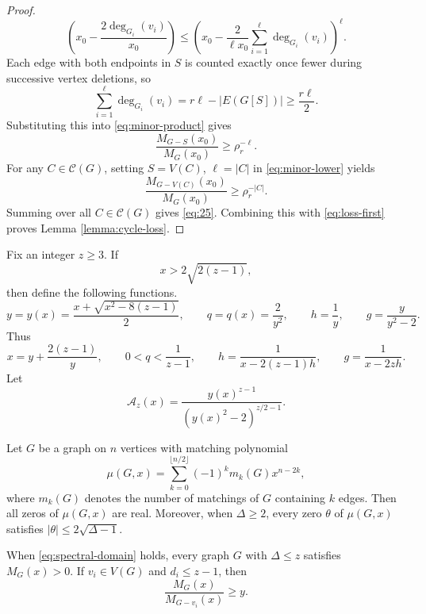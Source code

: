 \documentclass[11pt, a4paper]{article}
\begin{document}
\begin{proof}
\begin{equation}
\left(
x_0-\frac{2\deg_{G_i}(v_i)}{x_0}
\right)
\leq
\left(
x_0-\frac{2}{\ell x_0}
\sum_{i=1}^{\ell}\deg_{G_i}(v_i)
\right)^{\ell}.
\label{eq:minor-product}
\end{equation}
Each edge with both endpoints in $S$ is counted exactly once fewer during successive vertex deletions, so
\[
 \sum_{i=1}^{\ell}\deg_{G_i}(v_i)
 =r\ell-|E(G[S])|\geq\frac{r\ell}{2}.
\]
Substituting this into \eqref{eq:minor-product} gives
\begin{equation}\label{eq:minor-lower}
 \frac{M_{G-S}(x_0)}{M_G(x_0)}\geq \rho_r^{-\ell}.
\end{equation}
For any $C\in\mathcal{C}(G)$,
setting $S=V(C)$, $\ell=|C|$ in \eqref{eq:minor-lower} yields
\[
\frac{M_{G-V(C)}(x_0)}
{M_G(x_0)}
\ge
\rho_r^{-|C|}.
\]
Summing over all $C\in\mathcal{C}(G)$ gives \eqref{eq:25}.
Combining this with \eqref{eq:loss-first} proves Lemma \ref{lemma:cycle-loss}.
\end{proof}

Fix an integer $z\geq3$. If
\begin{equation}\label{eq:spectral-domain}
 x>2\sqrt{2(z-1)},
\end{equation}
then define the following functions.
\begin{equation}\label{eq:yqg}
 y=y(x)=\frac{x+\sqrt{x^2-8(z-1)}}2,
 \qquad q=q(x)=\frac2{y^2}, \qquad
 h=\frac1y, \qquad g=\frac{y}{y^2-2}.
\end{equation}
Thus
\begin{equation}\label{eq:y-identities}
 x=y+\frac{2(z-1)}y, \qquad
 0<q<\frac1{z-1}, \qquad
 h=\frac1{x-2(z-1)h}, \qquad
 g=\frac1{x-2zh}.
\end{equation}
Let
\begin{equation}\label{eq:tree-expression}
 \mathcal{A}_z(x)=\frac{y(x)^{z-1}}
                {(y(x)^2-2)^{z/2-1}}.
\end{equation}

\begin{lemma}\label{lem:30}
Let $G$ be a graph on $n$ vertices with matching polynomial
\[
\mu(G,x)
=
\sum_{k=0}^{\lfloor n/2\rfloor}
(-1)^k m_k(G)x^{n-2k},
\]
where $m_k(G)$ denotes the number of matchings of $G$ containing $k$ edges.
Then all zeros of $\mu(G,x)$ are real. Moreover, when $\Delta\ge 2$,
every zero $\theta$ of $\mu(G,x)$ satisfies
$|\theta|\le 2\sqrt{\Delta-1}$.
\end{lemma}

\begin{lemma}\label{lem:matching-positive}
When \eqref{eq:spectral-domain} holds, every graph $G$ with $\Delta \leq z$
satisfies $M_G(x)>0$.
If $v_i\in V(G)$ and $d_i\leq z-1$, then
\begin{equation}\label{eq:cavity-lower}
 \frac{M_G(x)}{M_{G-v_i}(x)}\geq y.
\end{equation}
\end{lemma}
\end{document}

